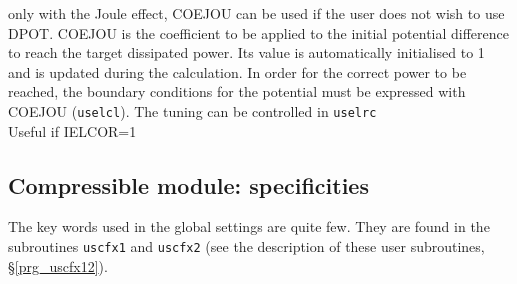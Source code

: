 {only with the Joule effect, COEJOU can be used if the user does not
wish to use DPOT. COEJOU is the coefficient to be applied to the initial
potential difference to reach the target dissipated power. Its value is
automatically initialised to 1 and is updated during the calculation.
In order for the correct power to be reached, the boundary
conditions for the potential must be expressed with COEJOU (\texttt{uselcl}). The
tuning can be controlled in \texttt{uselrc}\\
Useful if IELCOR=1}

\subsection{Compressible module: specificities}

The key words used in the global settings are quite few. They are
found in the subroutines \texttt{uscfx1} and \texttt{uscfx2} (see the
description of these user subroutines, \S\ref{prg_uscfx12}).


